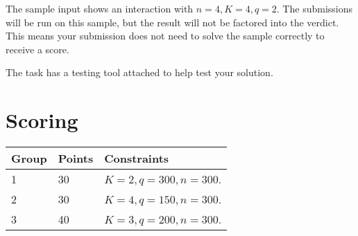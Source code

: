 The sample input shows an interaction with $n = 4, K = 4, q = 2$. 
The submissions will be run on this sample, but the result will not be factored into the verdict. This means your submission does not need to solve the sample correctly to receive a score.

The task has a testing tool attached to help test your solution.

\section*{Scoring}
\begin{tabular}{|l|l|l|}
\hline
Group & Points & Constraints \\ \hline
1     & 30   & $K = 2, q = 300, n = 300$. \\ \hline
2     & 30   & $K = 4, q = 150, n = 300$. \\ \hline
3     & 40   & $K = 3, q = 200, n = 300$. \\ \hline
\end{tabular}
